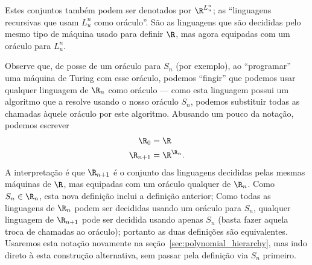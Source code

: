 Estes conjuntos também podem ser denotados por $\R^{L_u^n}$;
as ``linguagens recursivas que usam $L_u^n$ como oráculo''.
São as linguagens que são decididas
pelo mesmo tipo de máquina usado para definir $\R$,
mas agora equipadas com um oráculo para $L_u^n$.

Observe que,
de posse de um oráculo para $S_n$ (por exemplo),
ao ``programar'' uma máquina de Turing com esse oráculo,
podemos ``fingir'' que podemos usar qualquer linguagem de $\R_n$ como oráculo
--- como esta linguagem possui um algoritmo que a resolve
usando o nosso oráculo $S_n$,
podemos substituir todas as chamadas àquele oráculo
por este algoritmo.
Abusando um pouco da notação,
podemos escrever
\begin{equation}
    \begin{aligned}
        \R_0 &= \R \\
        \R_{n+1} &= \R^{\R_n}.
    \end{aligned}
    \label{eq:oracle_notation_abuse}
\end{equation}
A interpretação é que $\R_{n+1}$ é o conjunto das linguagens
decididas pelas mesmas máquinas de $\R$,
mas equipadas com um oráculo qualquer de $\R_n$.
Como $S_n \in \R_n$, esta nova definição inclui a definição anterior;
Como todas as linguagens de $\R_n$ podem ser decididas usando um oráculo para $S_n$,
qualquer linguagem de $\R_{n+1}$
pode ser decidida usando apenas $S_n$
(basta fazer aquela troca de chamadas ao oráculo);
portanto as duas definições são equivalentes.
Usaremos esta notação novamente na seção~\ref{sec:polynomial_hierarchy},
mas indo direto à esta construção alternativa,
sem passar pela definição via $S_n$ primeiro.
